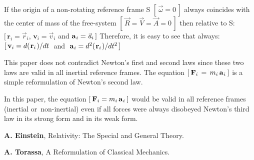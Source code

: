 \documentclass[10pt]{article}
\begin{document}
\par \bigskip\smallskip \noindent If the origin of a non-rotating reference frame S $[ \, {\vec{\omega}} = 0 \, ]$ always coincides with the center of mass of the free-system $[ \, {\vec{\mathit{R}}} = {\vec{\mathit{V}}} = {\vec{\mathit{A}}} = 0 \, ]$ then relative to S: $[ \, {\mathbf{r}}_i = {\vec{\mathit{r}}}_i$, ${\mathbf{v}}_i = {\vec{\mathit{v}}}_i$ and ${\mathbf{a}}_{\hspace{+0.045em}i} = {\vec{\mathit{a}}}_i \, ]$ Therefore, it is easy to see that always: $[ \, {\mathbf{v}}_i = d(\hspace{+0.090em}{\mathbf{r}}_i\hspace{+0.090em})/dt$ $\;$and$\;$ ${\mathbf{a}}_{\hspace{+0.045em}i} = d^2(\hspace{+0.090em}{\mathbf{r}}_i\hspace{+0.090em})/dt^2 \, ]$

\par \bigskip\smallskip \noindent This paper does not contradict Newton's first and second laws since these two laws are valid in all inertial reference frames. The equation $[ \: {\mathbf{F}}_i \,=\, m_i \, {\mathbf{a}}_{\hspace{+0.045em}i} \: ]$ is a simple reformulation of Newton's second law.

\par \bigskip\smallskip \noindent In this paper, the equation $[ \: {\mathbf{F}}_i = m_i \, {\mathbf{a}}_{\hspace{+0.045em}i} \: ]$ would be valid in all reference frames (\hspace{+0.180em}inertial \hbox {or non-inertial\hspace{+0.180em})} even if all forces were always disobeyed Newton's third law in its strong form and in its weak form.

\vspace{-0.90em}

\par {}

\par \bigskip\smallskip \noindent \textbf{A. Einstein}, Relativity: The Special and General Theory.

\par \bigskip\smallskip \noindent \textbf{A. Torassa}, A Reformulation of Classical Mechanics.
\end{document}
